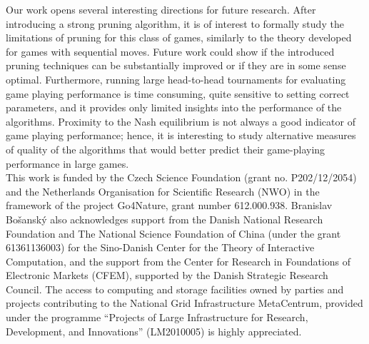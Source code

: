 Our work opens several interesting directions for future research. After introducing a strong pruning algorithm, it is of interest to formally study the limitations of pruning for this class of games, similarly to the theory developed for games with sequential moves. Future work could show if the introduced pruning techniques can be substantially improved or if they are in some sense optimal. 
Furthermore, running large head-to-head tournaments for evaluating game playing performance is time consuming, quite sensitive to setting correct parameters, and it provides only limited insights into the performance of the algorithms. Proximity to the Nash equilibrium is not always a good indicator of game playing performance; hence, it is interesting to study alternative measures of quality of the algorithms that would better predict their game-playing performance in large games. \\

 This work is funded by the Czech Science Foundation (grant no. P202/12/2054) and the Netherlands
Organisation for Scientific Research (NWO) in the framework of the project Go4Nature, grant number 612.000.938.
Branislav Bo{\v s}ansk{\' y} also acknowledges support from the Danish National Research Foundation and The National Science Foundation of China (under the grant 61361136003) for the Sino-Danish Center for the Theory of Interactive Computation, and the support
from the Center for Research in Foundations of Electronic Markets (CFEM), supported by the Danish Strategic Research Council.
The access to computing and storage facilities owned by parties and projects contributing to the National Grid
Infrastructure MetaCentrum, provided under the
programme ``Projects of Large Infrastructure for Research, Development, and Innovations'' (LM2010005) is highly appreciated.

